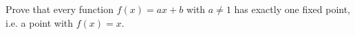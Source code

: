 Prove that every function $f(x)=ax+b$ with $a\ne1$ has exactly one fixed point, i.e. a point with $f(x)=x$.
